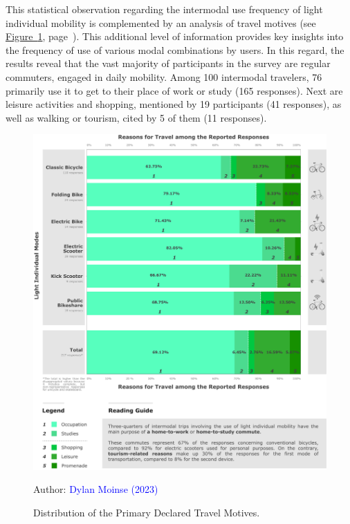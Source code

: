 \begin{refsegment}
This statistical observation regarding the intermodal use frequency of light individual mobility is complemented by an analysis of travel motives (see \hyperref[fig-chap4:motifs-modes]{Figure~\ref{fig-chap4:motifs-modes}}, page~\pageref{fig-chap4:motifs-modes}). This additional level of information provides key insights into the frequency of use of various modal combinations by users. In this regard, the results reveal that the vast majority of participants in the survey are regular commuters, engaged in daily mobility. Among 100 intermodal travelers, 76 primarily use it to get to their place of work or study (165 responses). Next are leisure activities and shopping, mentioned by 19 participants (41 responses), as well as walking or tourism, cited by 5 of them (11 responses).%

\begin{figure}[h!]\vspace*{4pt}
    \caption{Distribution of the Primary Declared Travel Motives.}
    \label{fig-chap4:motifs-modes}
    \centerline{\includegraphics[width=1\columnwidth]{src/Figures/Chap-4/EN_Motifs.pdf}}
    \vspace{5pt}
    \begin{flushright}\scriptsize{
    Author: \textcolor{blue}{Dylan Moinse (2023)}
    }\end{flushright}
\end{figure}


\end{refsegment}
